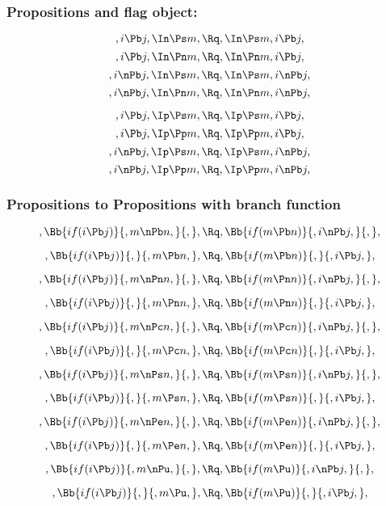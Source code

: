 \bigskip
\bigskip
\bigskip
\bigskip
\subsubsection{ Propositions and flag object:}
\[,i \Pb j, \In \Ps m, \Rq , \In \Ps m, i \Pb j,\]
\[,i \Pb j, \In \Pn m, \Rq , \In \Pn m, i \Pb j,\]
\[,i \nPb j,\In \Ps m, \Rq , \In \Ps m, i \nPb j,\]
\[,i \nPb j, \In \Pn m, \Rq , \In \Pn m, i \nPb j,\]

\[,i \Pb j, \Ip \Ps m, \Rq , \Ip \Ps m, i \Pb j,\]
\[,i \Pb j, \Ip \Pp m, \Rq , \Ip \Pp m, i \Pb j,\]
\[,i \nPb j,\Ip \Ps m, \Rq , \Ip \Ps m, i \nPb j,\]
\[,i \nPb j, \Ip \Pp m, \Rq , \Ip \Pp m, i \nPb j,\]



\bigskip
\bigskip
\bigskip
\bigskip
\subsubsection{ Propositions to Propositions with branch function}
\[, \Bb{if(i \Pb j)}{,m \nPb n,}{,}, \Rq , \Bb{if(m \Pb n)}{,i \nPb j,}{,},\]

\bigskip
\bigskip
\[, \Bb{if(i \Pb j)}{,}{,m \Pb n,}, \Rq , \Bb{if(m \Pb n)}{,}{,i \Pb j,},\]


\bigskip
\bigskip
\[, \Bb{if(i \Pb j)}{,m \nPn n,}{,}, \Rq , \Bb{if(m \Pn n)}{,i \nPb j,}{,},\]

\bigskip
\bigskip
\[, \Bb{if(i \Pb j)}{,}{,m \Pn n,}, \Rq , \Bb{if(m \Pn n)}{,}{,i \Pb j,},\]


\bigskip
\bigskip
\[, \Bb{if(i \Pb j)}{,m \nPc n,}{,}, \Rq , \Bb{if(m \Pc n)}{,i \nPb j,}{,},\]

\bigskip
\bigskip
\[, \Bb{if(i \Pb j)}{,}{,m \Pc n,}, \Rq , \Bb{if(m \Pc n)}{,}{,i \Pb j,},\]


\bigskip
\bigskip
\[, \Bb{if(i \Pb j)}{,m \nPs n,}{,}, \Rq , \Bb{if(m \Ps n)}{,i \nPb j,}{,},\]

\bigskip
\bigskip
\[, \Bb{if(i \Pb j)}{,}{,m \Ps n,}, \Rq , \Bb{if(m \Ps n)}{,}{,i \Pb j,},\]

\bigskip
\bigskip
\[, \Bb{if(i \Pb j)}{,m \nPe n,}{,}, \Rq , \Bb{if(m \Pe n)}{,i \nPb j,}{,},\]

\bigskip
\bigskip
\[, \Bb{if(i \Pb j)}{,}{,m \Pe n,}, \Rq , \Bb{if(m \Pe n)}{,}{,i \Pb j,},\]

\bigskip
\bigskip
\[, \Bb{if(i \Pb j)}{,m \nPu,}{,}, \Rq , \Bb{if(m \Pu)}{,i \nPb j,}{,},\]

\bigskip
\bigskip
\[, \Bb{if(i \Pb j)}{,}{,m \Pu,}, \Rq , \Bb{if(m \Pu)}{,}{,i \Pb j,},\]





